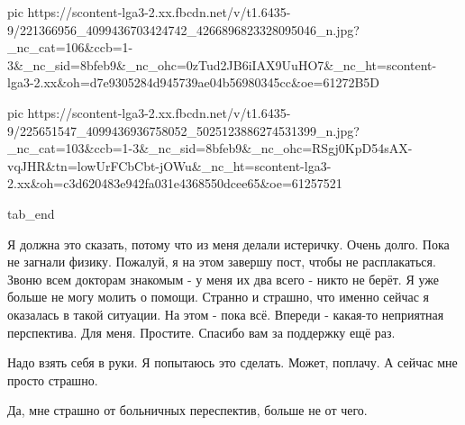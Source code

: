      pic https://scontent-lga3-2.xx.fbcdn.net/v/t1.6435-9/221366956_4099436703424742_4266896823328095046_n.jpg?_nc_cat=106&ccb=1-3&_nc_sid=8bfeb9&_nc_ohc=0zTud2JB6iIAX9UuHO7&_nc_ht=scontent-lga3-2.xx&oh=d7e9305284d945739ae04b56980345cc&oe=61272B5D

     pic https://scontent-lga3-2.xx.fbcdn.net/v/t1.6435-9/225651547_4099436936758052_5025123886274531399_n.jpg?_nc_cat=103&ccb=1-3&_nc_sid=8bfeb9&_nc_ohc=RSgj0KpD54sAX-vqJHR&tn=lowUrFCbCbt-jOWu&_nc_ht=scontent-lga3-2.xx&oh=c3d620483e942fa031e4368550dcee65&oe=61257521

  tab_end
\fi

Я должна это сказать, потому что из меня делали истеричку. Очень долго. Пока не
загнали физику. Пожалуй, я на этом завершу пост, чтобы не расплакаться. Звоню
всем докторам знакомым - у меня их два всего - никто не берёт. Я уже больше не
могу молить о помощи. Странно и страшно, что именно сейчас я оказалась в такой
ситуации. На этом - пока всё. Впереди - какая-то неприятная перспектива. Для
меня. Простите. Спасибо вам за поддержку ещё раз. 

Надо взять себя в руки. Я попытаюсь это сделать. Может, поплачу. А сейчас мне
просто страшно. 

Да, мне страшно от больничных переспектив, больше не от чего.

